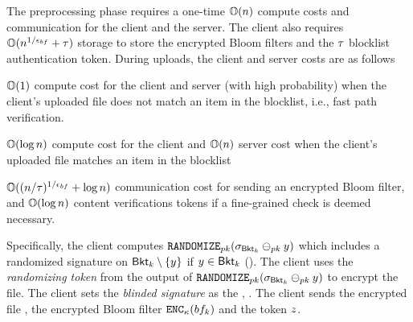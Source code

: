 %
The preprocessing phase requires a one-time $\mathbb{O}(n)$ compute costs and communication for the client and the server. The client also requires $\mathbb{O}(n^{1/\epsilon_{bf}} + \tau)$ storage to store the encrypted Bloom filters and the $\tau$ blocklist authentication token. During uploads, the client and server costs are as follows


\itemListStart
\item $\mathbb{O}(1)$ compute cost for the client and server (with high probability) when the client's uploaded file does not match an item in the blocklist, i.e., fast path verification.
\item $\mathbb{O}(\log n)$ compute cost for the client and $\mathbb{O}(n)$ server cost when the client's uploaded file matches an item in the blocklist
\item $\mathbb{O}((n/\tau)^{1/\epsilon_{bf}} + \log n)$ communication cost for sending an encrypted Bloom filter, and $\mathbb{O}(\log n)$ content verifications tokens if a fine-grained check is deemed necessary. 
\itemListEnd

\iffalse 
Specifically, the client computes $\randomize[\pubKey](\genericSig[\bucket{\bloomFilterIdx}] \sigMinus[\pubKey] \genericCInputElmt)$ which includes a randomized signature on $\bucket{\bloomFilterIdx} \setminus \{\genericCInputElmt\}$ if $\genericCInputElmt \in \bucket{\bloomFilterIdx}$ (). The client uses the \emph{randomizing token} from the output of $\randomize[\pubKey](\genericSig[\bucket{\bloomFilterIdx}] \sigMinus[\pubKey] \genericCInputElmt)$ to encrypt the file. 
The client sets the \emph{blinded signature} as the \contentToken, \cOutputMeta. The client sends the encrypted file \cOutputFile, the encrypted Bloom filter $\encrypt[\genericSymmKey](\bloomFilter[\bloomFilterIdx])$ and the token $z$. 




